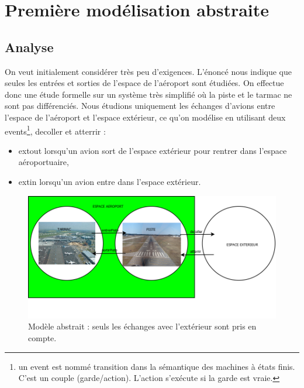 \section{Première modélisation abstraite}
	
\subsection{Analyse}
   On veut initialement considérer très peu d'exigences. L'énoncé nous indique
   que seules les entrées et sorties de l'espace de l'aéroport sont étudiées. On effectue donc une étude formelle sur un système très simplifié où la piste et le tarmac ne sont pas différenciés. Nous étudions uniquement les échanges d'avions entre l'espace de l'aéroport et l'espace extérieur, ce qu'on modélise en utilisant deux events\footnote{un event est nommé transition dans la sémantique des machines à états finis. C'est un couple (garde/action). L'action s'exécute si la garde est vraie.}, decoller et atterrir :
   
   \begin{itemize}
   	\item extout lorsqu'un avion sort de l'espace extérieur pour rentrer dans l'espace aéroportuaire,
   	\item extin lorsqu'un avion entre dans l'espace extérieur.
   \end{itemize} 

\begin{figure}[H]
	\begin{center}	
		\includegraphics[scale=0.4]{images/0/mod0}
		\caption{Modèle abstrait : seuls les échanges avec l'extérieur sont pris en compte.}
		\label{mod0}
	\end{center}
\end{figure}


